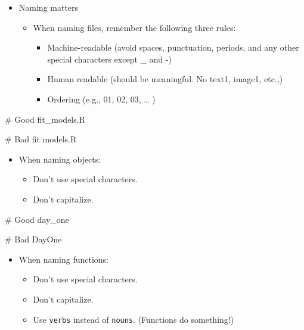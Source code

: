 \documentclass[
  letterpaper,
  DIV=11,
  numbers=noendperiod]{scrreprt}
\newenvironment{Shaded}{\begin{snugshade}}{\end{snugshade}}
\newcommand{\CommentTok}[1]{\textcolor[rgb]{0.37,0.37,0.37}{#1}}
\newcommand{\NormalTok}[1]{\textcolor[rgb]{0.00,0.23,0.31}{#1}}
\providecommand{\tightlist}{%
  \setlength{\itemsep}{0pt}\setlength{\parskip}{0pt}}\usepackage{longtable,booktabs,array}
\begin{document}
\begin{itemize}
\item
  Naming matters

  \begin{itemize}
  \tightlist
  \item
    When naming files, remember the following three rules:

    \begin{itemize}
    \tightlist
    \item
      Machine-readable (avoid spaces, punctuation, periods, and any
      other special characters except \_ and -)
    \item
      Human readable (should be meaningful. No text1, image1, etc.,)
    \item
      Ordering (e.g., 01, 02, 03, \ldots{} )
    \end{itemize}
  \end{itemize}
\end{itemize}

\begin{Shaded}
\begin{Highlighting}[]
\CommentTok{\# Good}
\NormalTok{fit\_models.R}

\CommentTok{\# Bad}
\NormalTok{fit models.R}
\end{Highlighting}
\end{Shaded}

\begin{itemize}
\tightlist
\item
  When naming objects:

  \begin{itemize}
  \tightlist
  \item
    Don't use special characters.
  \item
    Don't capitalize.
  \end{itemize}
\end{itemize}

\begin{Shaded}
\begin{Highlighting}[]
\CommentTok{\# Good }
\NormalTok{day\_one}
    
\CommentTok{\# Bad }
\NormalTok{DayOne}
\end{Highlighting}
\end{Shaded}

\begin{itemize}
\tightlist
\item
  When naming functions:

  \begin{itemize}
  \tightlist
  \item
    Don't use special characters.
  \item
    Don't capitalize.
  \item
    Use \texttt{verbs} instead of \texttt{nouns}. (Functions do
    something!)
  \end{itemize}
\end{itemize}
\end{document}
